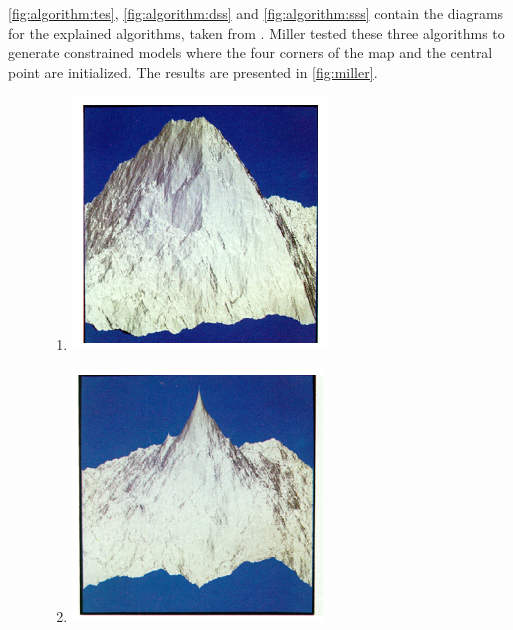 \documentclass{acmtog}
\begin{document}
\autoref{fig:algorithm:tes}, \autoref{fig:algorithm:dss} and \autoref{fig:algorithm:sss} contain the diagrams for the explained algorithms, taken from \cite{Macklem03}. Miller tested these three algorithms to generate constrained models where the four corners of the map and the central point are initialized. The results are presented in \autoref{fig:miller}.

\begin{figure}[!htp]
	\begin{center}
		\begin{enumerate}
		\item{\includegraphics[width=0.7\columnwidth]{images/algorithm/triangleedge-mountain.png}\label{itm:tes}}
		\item{\includegraphics[width=0.7\columnwidth]{images/algorithm/diamondsquare-mountain.png}\label{itm:dss}}

\end{enumerate}
\end{center}
\end{figure}
\end{document}
